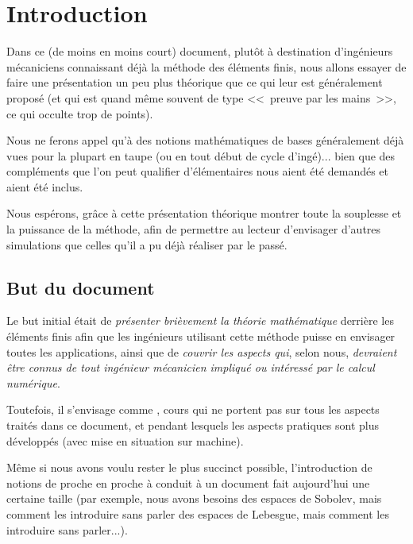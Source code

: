 \documentclass[11pt,pdflatex]{book}
\begin{document}
\chapter*{Introduction}

Dans ce (de moins en moins court) document, plutôt à destination d'ingénieurs
mécaniciens  connaissant déjà la méthode des éléments finis,
nous allons essayer de faire une présentation un peu plus théorique que ce qui 
leur est généralement proposé (et qui est quand même souvent de type 
<<~preuve par les mains~>>, ce qui occulte trop de points).

Nous ne ferons appel qu'à des notions mathématiques de bases généralement 
déjà vues pour la plupart en taupe (ou en tout début de cycle d'ingé)... bien
que des compléments que l'on peut qualifier d'élémentaires nous aient été
demandés et aient été inclus.

Nous espérons, grâce à cette présentation théorique
montrer toute la souplesse et la puissance de la méthode, afin
de permettre au lecteur d'envisager d'autres simulations que celles
qu'il a pu déjà réaliser par le passé.





\bigskip
\section*{But du document}

Le but initial était de \emph{présenter brièvement la théorie mathématique} derrière
les éléments finis afin que les ingénieurs utilisant cette méthode puisse en envisager
toutes les applications, ainsi que de \emph{couvrir les aspects qui}, selon nous, \emph{devraient être
connus de tout ingénieur mécanicien impliqué ou intéressé par le calcul numérique}.

Toutefois, il s'envisage comme , 
cours qui ne portent pas sur tous les aspects traités dans ce document, et pendant lesquels les aspects 
pratiques sont plus développés (avec mise en situation sur machine).

\medskip
Même si nous avons voulu rester le plus succinct possible, l'introduction de
notions de proche en proche à conduit à un document fait aujourd'hui une
certaine taille (par exemple, nous avons besoins des espaces de Sobolev, mais
comment les introduire sans parler des espaces de Lebesgue, mais comment
les introduire sans parler...).
\end{document}
